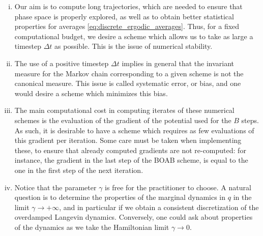      \begin{enumerate}[(i)]
         \item Our aim is to compute long trajectories, which are needed to ensure that phase space is properly explored, as well as to obtain better statistical properties for averages \eqref{eq:discrete_ergodic_averages}. Thus, for a fixed computational budget, we desire a scheme which allows us to take as large a timestep $\Delta t$ as possible. This is the issue of numerical stability.
         \item The use of a positive timestep $\Delta t$ implies in general that the invariant measure for the Markov chain corresponding to a given scheme is not the canonical measure. This issue is called systematic error, or bias, and one would desire a scheme which minimizes this bias.
         \item The main computational cost in computing iterates of these numerical schemes is the evaluation of the gradient of the potential used for the $B$ steps. As such, it is desirable to have a scheme which requires as few evaluations of this gradient per iteration. Some care must be taken when implementing these, to ensure that already computed gradients are not re-computed: for instance, the gradient in the last step of the BOAB scheme, is equal to the one in the first step of the next iteration.
         \item Notice that the parameter $\gamma$ is free for the practitioner to choose. A natural question is to determine the properties of the marginal dynamics in $q$ in the limit $\gamma \to +\infty$, and in particular if we obtain a consistent discretization of the overdamped Langevin dynamics. Conversely, one could ask about properties of the dynamics as we take the Hamiltonian limit $\gamma\to 0$.
     \end{enumerate}

